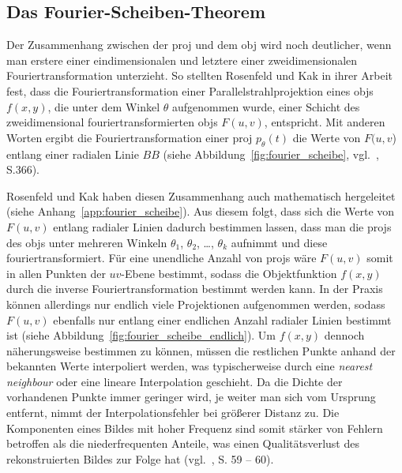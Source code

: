 \subsection{Das Fourier-Scheiben-Theorem}\label{ssec:fourier_scheibe}

Der Zusammenhang zwischen der \gls{proj} und dem \gls{obj} wird noch deutlicher, wenn man erstere einer eindimensionalen
und letztere einer zweidimensionalen Fouriertransformation unterzieht. So stellten Rosenfeld und Kak in ihrer Arbeit
fest, dass die Fouriertransformation einer Parallelstrahlprojektion eines \gls{obj}s $f(x, y)$, die unter dem Winkel
$\theta$ aufgenommen wurde, einer Schicht des zweidimensional fouriertransformierten \gls{obj}s $F(u, v)$, entspricht.
Mit anderen Worten ergibt die Fouriertransformation einer \gls{proj} $p_{\theta}(t)$ die Werte von $F(u, v$) entlang
einer radialen Linie $BB$ (siehe Abbildung~\ref{fig:fourier_scheibe}, vgl.~\cite{rosenkak}, S.366).

Rosenfeld und Kak haben diesen Zusammenhang auch mathematisch hergeleitet (siehe Anhang~\ref{app:fourier_scheibe}). 
Aus diesem folgt, dass sich die Werte von $F(u, v)$ entlang radialer Linien dadurch bestimmen lassen, dass man die
\glspl{proj} des \gls{obj}s unter mehreren Winkeln $\theta_1$, $\theta_2$, \ldots, $\theta_k$ aufnimmt und diese
fouriertransformiert. Für eine unendliche Anzahl von \glspl{proj} wäre $F(u, v)$ somit in allen Punkten der $uv$-Ebene
bestimmt, sodass die Objektfunktion $f(x, y)$ durch die inverse Fouriertransformation bestimmt werden kann. In der
Praxis können allerdings nur endlich viele Projektionen aufgenommen werden, sodass $F(u, v)$ ebenfalls nur entlang einer
endlichen Anzahl radialer Linien bestimmt ist (siehe Abbildung~\ref{fig:fourier_scheibe_endlich}). Um $f(x, y)$ dennoch
näherungsweise bestimmen zu können, müssen die restlichen Punkte anhand der bekannten Werte interpoliert werden, was
typischerweise durch eine \textit{nearest neighbour} oder eine lineare Interpolation geschieht. Da die Dichte der
vorhandenen Punkte immer geringer wird, je weiter man sich vom Ursprung entfernt, nimmt der Interpolationsfehler bei
größerer Distanz zu. Die Komponenten eines Bildes mit hoher Frequenz sind somit stärker von Fehlern betroffen als die
niederfrequenten Anteile, was einen Qualitätsverlust des rekonstruierten Bildes zur Folge hat (vgl.~\cite{kakslan},
S. 59 -- 60).

